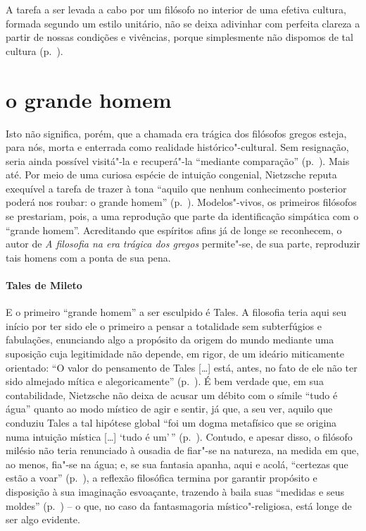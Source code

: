 \begin{hedraquote} 
A tarefa a ser levada a cabo por um filósofo no interior
de uma efetiva cultura, formada segundo um estilo unitário, não se
deixa adivinhar com perfeita clareza a partir de nossas condições e
vivências, porque simplesmente não dispomos de tal
cultura (p.~\pageref{tarefaaserlevada}).
\end{hedraquote} 

\section{o grande homem}
Isto não significa, porém, que a chamada era trágica dos filósofos
gregos esteja, para nós, morta e enterrada como realidade
histórico"-cultural. Sem resignação, seria ainda possível visitá"-la e
recuperá"-la ``mediante comparação'' (p.~\pageref{comparacao}). Mais até. Por
meio de uma curiosa espécie de intuição congenial, Nietzsche reputa
exequível a tarefa de trazer à tona ``aquilo que nenhum
conhecimento posterior poderá nos roubar: o grande
homem'' (p.~\pageref{ograndehomem}). Modelos"-vivos, os
primeiros filósofos se prestariam, pois, a uma reprodução que parte da
identificação simpática com o ``grande
homem''. Acreditando que espíritos afins já de longe se
reconhecem, o autor de \textit{A filosofia na era trágica dos gregos}
permite"-se, de sua parte, reproduzir tais homens com a ponta de sua pena.

\paragraph{Tales de Mileto} E o primeiro ``grande homem'' a ser esculpido
é Tales. A filosofia teria aqui seu início por ter sido ele o primeiro
a pensar a totalidade sem subterfúgios e fabulações, enunciando algo a
propósito da origem do mundo mediante uma suposição cuja legitimidade
não depende, em rigor, de um ideário miticamente orientado:
``O valor do pensamento de Tales [\ldots] está, antes, no
fato de ele não ter sido almejado mítica e
alegoricamente'' (p.~\pageref{pensamentodetales}). É bem
verdade que, em sua contabilidade, Nietzsche não deixa de acusar um
débito com o símile ``tudo é água'' quanto ao modo
místico de agir e sentir, já que, a seu ver, aquilo que conduziu Tales
a tal hipótese global ``foi um dogma metafísico que se
origina numa intuição mística [\ldots] `tudo é
um'\,'' (p.~\pageref{foiumdogma}). Contudo, e apesar
disso, o filósofo milésio não teria renunciado à ousadia de fiar"-se na
natureza, na medida em que, ao menos, fia"-se na água; e, se sua
fantasia apanha, aqui e acolá, ``certezas que estão a
voar'' (p.~\pageref{certezasque}), a reflexão
filosófica termina por garantir propósito e disposição à
sua imaginação esvoaçante, trazendo à baila suas ``medidas
e seus moldes'' (p.~\pageref{medidaseseusmoldes}) -- o que, no
caso da fantasmagoria místico"-religiosa, está longe de ser algo
evidente.

